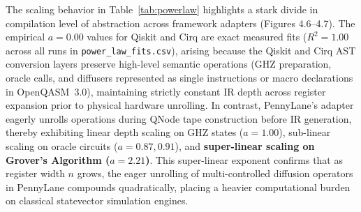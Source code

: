\documentclass[runningheads]{llncs}
\begin{document}
\begin{table}[htbp]
\centering
\caption{Power-law depth scaling exponents ($D = c \cdot n^a$; exponent $a$ shown) across framework adapters, fitted over the evaluated $n \in [2, 8]$ qubit sweep (Report Table~4.5). Qiskit and Cirq adapters preserve high-level abstract operations and custom gate definitions in OpenQASM~3.0 prior to hardware unrolling, yielding strictly constant depth ($a=0.00$, $D(n) = c \cdot n^0 = c$). In contrast, PennyLane eagerly expands operations during QNode tape evaluation, exposing the underlying algorithmic scaling ($a \ge 0.87$).}
\label{tab:powerlaw}
\renewcommand{\arraystretch}{1.15}
\setlength{\tabcolsep}{10pt}
\end{table}

The scaling behavior in Table~\ref{tab:powerlaw} highlights a stark divide in compilation level of abstraction across framework adapters (Figures 4.6--4.7). The empirical $a = 0.00$ values for Qiskit and Cirq are exact measured fits ($R^2 = 1.00$ across all runs in \texttt{power\_law\_fits.csv}), arising because the Qiskit and Cirq AST conversion layers preserve high-level semantic operations (GHZ preparation, oracle calls, and diffusers represented as single instructions or macro declarations in OpenQASM~3.0), maintaining strictly constant IR depth across register expansion prior to physical hardware unrolling. In contrast, PennyLane's adapter eagerly unrolls operations during QNode tape construction before IR generation, thereby exhibiting linear depth scaling on GHZ states ($a = 1.00$), sub-linear scaling on oracle circuits ($a = 0.87, 0.91$), and \textbf{super-linear scaling on Grover's Algorithm ($a = 2.21$)}. This super-linear exponent confirms that as register width $n$ grows, the eager unrolling of multi-controlled diffusion operators in PennyLane compounds quadratically, placing a heavier computational burden on classical statevector simulation engines.
\end{document}
